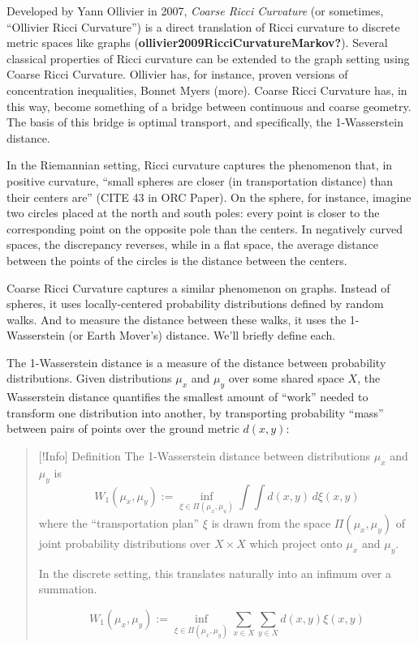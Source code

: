 \documentclass[
]{agujournal2019}
\begin{document}
Developed by Yann Ollivier in 2007, \emph{Coarse Ricci Curvature} (or
sometimes, ``Ollivier Ricci Curvature'') is a direct translation of
Ricci curvature to discrete metric spaces like graphs
(\textbf{ollivier2009RicciCurvatureMarkov?}). Several classical
properties of Ricci curvature can be extended to the graph setting using
Coarse Ricci Curvature. Ollivier has, for instance, proven versions of
concentration inequalities, Bonnet Myers (more). Coarse Ricci Curvature
has, in this way, become something of a bridge between continuous and
coarse geometry. The basis of this bridge is optimal transport, and
specifically, the 1-Wasserstein distance.

In the Riemannian setting, Ricci curvature captures the phenomenon that,
in positive curvature, ``small spheres are closer (in transportation
distance) than their centers are'' (CITE 43 in ORC Paper). On the
sphere, for instance, imagine two circles placed at the north and south
poles: every point is closer to the corresponding point on the opposite
pole than the centers. In negatively curved spaces, the discrepancy
reverses, while in a flat space, the average distance between the points
of the circles is the distance between the centers.

Coarse Ricci Curvature captures a similar phenomenon on graphs. Instead
of spheres, it uses locally-centered probability distributions defined
by random walks. And to measure the distance between these walks, it
uses the 1-Wasserstein (or Earth Mover's) distance. We'll briefly define
each.

The 1-Wasserstein distance is a measure of the distance between
probability distributions. Given distributions \(\mu_{x}\) and
\(\mu_{y}\) over some shared space \(X\), the Wasserstein distance
quantifies the smallest amount of ``work'' needed to transform one
distribution into another, by transporting probability ``mass'' between
pairs of points over the ground metric \(d(x,y)\):

\begin{quote}
{[}!Info{]} Definition The 1-Wasserstein distance between distributions
\(\mu_{x}\) and \(\mu_{y}\) is
\[ W_{1}(\mu_{x},\mu_{y}) := \inf_{\xi \in \Pi(\mu_{x},\mu_{u})} \int \int d(x,y) \, d\xi(x,y) \]
where the ``transportation plan'' \(\xi\) is drawn from the space
\(\Pi(\mu_{x},\mu_{y})\) of joint probability distributions over
\(X \times X\) which project onto \(\mu_{x}\) and \(\mu_{y}\).

In the discrete setting, this translates naturally into an infimum over
a summation.

\[W_{1}(\mu_{x},\mu_{y}) := \inf_{\xi \in \Pi(\mu_{x},\mu_{y})} \sum_{x \in X} \sum_{y \in X} d(x,y) \xi(x,y)\]
\end{quote}
\end{document}
